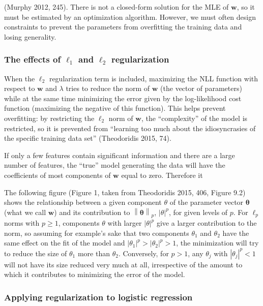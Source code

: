 \documentclass[letterpaper, 12pt]{article}
\newcommand{\norm}[1]{\left\lVert #1 \right\rVert}
\newcommand{\vect}[1]{\boldsymbol{#1}}
\begin{document}
(Murphy 2012, 245). There is not a closed-form solution for the MLE of $\vect{w}$, so it must be estimated by an optimization algorithm. However, we must often design constraints to prevent the parameters from overfitting the training data and losing generality.

\subsubsection{The effects of $\ell_1$ and $\ell_2$ regularization}

When the $\ell_2$ regularization term is included, maximizing the NLL function with respect to $\vect{w}$ and $\lambda$ tries to reduce the norm of $\vect{w}$ (the vector of parameters) while at the same time minimizing the error given by the log-likelihood cost function (maximizing the negative of this function). This helps prevent overfitting: by restricting the $\ell_2$ norm of $\vect{w}$, the ``complexity'' of the model is restricted, so it is prevented from ``learning too much about the idiosyncrasies of the specific training data set'' (Theodoridis 2015, 74).

If only a few features contain significant information and there are a large number of features, the ``true'' model generating the data will have the coefficients of most components of $\vect{w}$ equal to zero. Therefore it 

The following figure (Figure 1, taken from Theodoridis 2015, 406, Figure 9.2) shows the relationship between a given component $\theta$ of the parameter vector $\vect{\theta}$ (what we call $\vect{w}$) and its contribution to $\norm{\vect{\theta}}_p$, $|\theta|^p$, for given levels of $p$. For $\ell_p$ norms with $p \geq 1$, components $\theta$ with larger $|\theta|^p$ give a larger contribution to the norm, so assuming for example's sake that two components $\theta_1$ and $\theta_2$ have the same effect on the fit of the model and $|\theta_1|^p > |\theta_2|^p > 1$, the minimization will try to reduce the size of $\theta_1$ more than $\theta_2$. Conversely, for $p > 1$, any $\theta_j$ with $|\theta_j|^p < 1$ will not have its size reduced very much at all, irrespective of the amount to which it contributes to minimizing the error of the model.

\subsubsection{Applying regularization to logistic regression}
\end{document}
